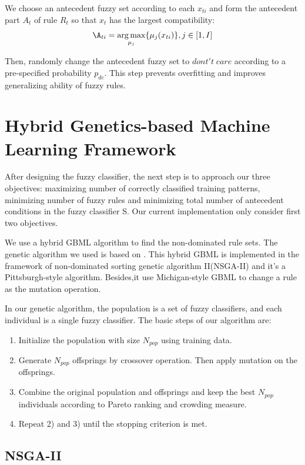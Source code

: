 \documentclass[conference]{IEEEtran}
\begin{document}
  We choose an antecedent fuzzy set according to each $x_{ti}$ and form the antecedent part $A_t$ of rule $R_t$ so that $x_{t}$ has the largest compatibility:
  $$ \A_{ti} = \underset{\mu_j}{\arg\max}\{\mu_{j}(x_{ti})\},j \in [1,I]$$
  
  Then, randomly change the antecedent fuzzy set to $dont't\;care$ according to a pre-specified probability $p_{dc}$. This step prevents overfitting and improves generalizing ability of fuzzy rules.
  \section{Hybrid Genetics-based Machine Learning Framework}
  After designing the fuzzy classifier, the next step is to approach our three objectives: maximizing number of correctly classified training patterns, minimizing number of fuzzy rules and minimizing total number of antecedent conditions in the fuzzy classifier S. Our current implementation only consider first two objectives.
	 
	 We use a hybrid GBML algorithm to find the non-dominated rule sets. The genetic algorithm we used is based on \cite{ishibuchi2007analysis}. This hybrid GBML is implemented in the framework of non-dominated sorting genetic algorithm II(NSGA-II) and it's a Pittsburgh-style algorithm. Besides,it use Michigan-style GBML to change a rule as the mutation operation. 
	 
  In our genetic algorithm, the population is a set of fuzzy classifiers, and each individual is a single fuzzy classifier. The basic steps of our algorithm are:
  \begin{enumerate}
  \item Initialize the population with size $N_{pop}$ using training data.
  \item Generate $N_{pop}$ offsprings by crossover operation. Then apply mutation on the offsprings.
  \item Combine the original population and offsprings and keep the best $N_{pop}$ individuals according to Pareto ranking and crowding measure.
  \item Repeat 2) and 3) until the stopping criterion is met.
  \end{enumerate}
  
	 
	 \subsection{NSGA-II}
	 
\end{document}
